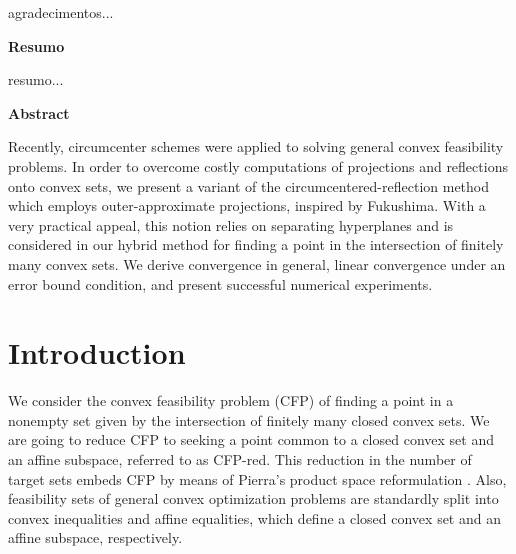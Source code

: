\documentclass[smallextended,numbook,nospthms]{svjour3}
\theoremstyle{plain}
\theoremstyle{definition}
\def\RR{\mathds R}
\begin{document}
\thispagestyle{empty}

\newpage
{}
\vspace{1pt}

agradecimentos...

\thispagestyle{empty}

\newpage
\begin{center}
\textbf{\normalsize Resumo}
\end{center}
\vspace{1pt}

resumo...

\thispagestyle{empty}

\newpage
\begin{center}
\textbf{\normalsize Abstract}
\end{center}
\vspace{1pt}

Recently, circumcenter schemes were  applied to solving general convex feasibility problems. In order to overcome costly computations of projections and reflections onto convex sets, we present a variant of the circumcentered-reflection method which employs outer-approximate projections, inspired by Fukushima.
With a very practical appeal, this  notion relies on separating hyperplanes and is considered in our hybrid method for finding a point in the intersection of finitely many convex sets.  We derive convergence in general, linear convergence under an error bound condition, and present successful numerical experiments.  


\thispagestyle{empty}

\newpage
\tableofcontents
\thispagestyle{empty}

\newpage
\section{Introduction}
We consider the convex feasibility problem (CFP) of finding a point in a nonempty set given by the intersection of finitely many closed convex sets. We are going to reduce CFP to seeking a point common to a closed convex set and an affine subspace, referred to as CFP-red. This reduction in the number of target sets embeds CFP by means of Pierra's product space reformulation \cite{Pierra:1984hl}. Also, feasibility sets of general convex optimization problems are standardly split into convex inequalities and affine equalities, which define a closed convex set and an affine subspace, respectively.

\end{document}
